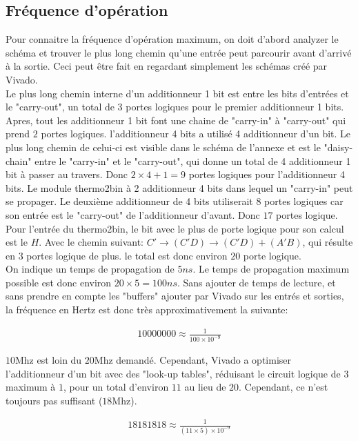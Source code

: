 \documentclass[a11paper]{article}
\begin{document}
\subsection{Fréquence d'opération}
Pour connaitre la fréquence d'opération maximum, on doit d'abord analyzer le schéma et trouver le plus long chemin qu'une entrée peut
parcourir avant d'arrivé à la sortie. Ceci peut être fait en regardant simplement les schémas créé par Vivado.
\\
Le plus long chemin interne d'un additionneur 1 bit est entre les bits d'entrées et le "carry-out", un total de $3$ portes logiques pour
le premier additionneur 1 bits. Apres, tout les additionneur 1 bit font une chaine  de "carry-in" à "carry-out" qui prend $2$ portes
logiques. l'additionneur 4 bits a utilisé 4 additionneur d'un bit. Le plus long chemin de celui-ci est visible
dans le schéma de l'annexe et est le "daisy-chain" entre le "carry-in" et le "carry-out", qui donne un total de 4 additionneur 1 bit à
passer au travers. Donc $2\times4+1=9$ portes logiques pour l'additionneur 4 bits. Le module thermo2bin à 2 additionneur 4 bits dans lequel
un "carry-in" peut se propager. Le deuxième additionneur de 4 bits utiliserait $8$ portes logiques car son entrée est le
"carry-out" de l'additionneur d'avant. Donc $17$ portes logique. Pour l'entrée du thermo2bin, le bit avec le plus de porte logique pour son
calcul est le $H$. Avec le chemin suivant: $C'\rightarrow(C'D)\rightarrow(C'D)+(A'B)$, qui résulte en $3$ portes logique
de plus. le total est donc environ $20$ porte logique.
\\
On indique un temps de propagation de $5ns$. Le temps de propagation maximum possible est donc environ $20\times5=100ns$. Sans ajouter de
temps de lecture, et sans prendre en compte les "buffers" ajouter par Vivado sur les entrés et sorties, la fréquence en Hertz est donc
très approximativement la suivante:

\begin{align}
	10000000 \approx \frac{1}{100\times10^{-9}}
\end{align}

$10\text{Mhz}$ est loin du $20\text{Mhz}$ demandé. Cependant, Vivado a optimiser l'additionneur d'un bit avec des "look-up tables",
réduisant le circuit logique de $3$ maximum à $1$, pour un total d'environ $11$ au lieu de $20$. Cependant, ce n'est toujours pas
suffisant ($18\text{Mhz}$).

\begin{align}
	18181818 \approx \frac{1}{(11\times5)\times10^{-9}}
\end{align}
\end{document}
